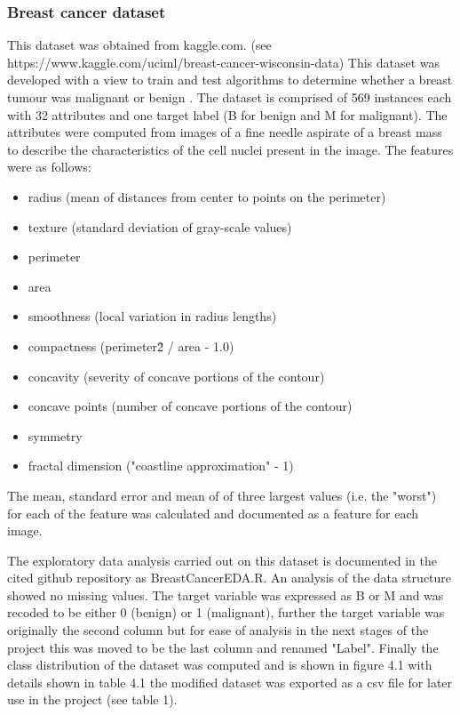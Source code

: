 \subsubsection{Breast cancer dataset}
This dataset was obtained from kaggle.com. \newline
(see https://www.kaggle.com/uciml/breast-cancer-wisconsin-data) \newline
This dataset was developed with a view to train and test algorithms to determine whether a breast tumour was malignant or benign \cite{}. \newline
The dataset is comprised of 569 instances each with 32 attributes and one target label (B for benign and M for malignant).\newline
The attributes were computed from images of a fine needle aspirate of a breast mass to describe the characteristics of the cell nuclei present in the image. The features were as follows:
\begin{itemize}
    \item radius (mean of distances from center to points on the perimeter)
    \item texture (standard deviation of gray-scale values) 
    \item perimeter 
    \item area 
    \item smoothness (local variation in radius lengths) 
    \item compactness (perimeter\^2 / area - 1.0)
    \item concavity (severity of concave portions of the contour)
    \item concave points (number of concave portions of the contour)
    \item symmetry
    \item fractal dimension ("coastline approximation" - 1)
\end{itemize}
The mean, standard error and mean of of three largest values (i.e. the "worst") for each of the feature was calculated and documented as a feature for each image.\newline

The exploratory data analysis carried out on this dataset is documented in the cited github repository as BreastCancerEDA.R.\newline
An analysis of the data structure showed no missing values. The target variable was expressed as B or M and was recoded to be either 0 (benign) or 1 (malignant), further the target variable was originally the second column but for ease of analysis in the next stages of the project this was moved to be the last column and renamed "Label".
Finally the class distribution of the dataset was computed and is shown in figure 4.1 with details shown in table 4.1 the modified dataset was exported as a csv file for later use in the project (see table 1).\newline


